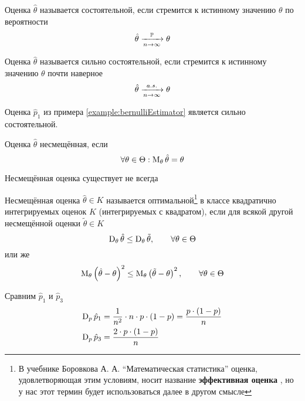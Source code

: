 \begin{definition}
    Оценка $\hat{\theta}$ называется состоятельной,
    если стремится к истинному значению $\theta$ по вероятности
    $$\hat{\theta}\xrightarrow[n\to\infty]{\mathbb{P}}\theta$$
\end{definition}
\begin{definition}
    Оценка $\hat{\theta}$ называется сильно состоятельной,
    если стремится к истинному значению $\theta$ почти наверное
    $$\hat{\theta}\xrightarrow[n\to\infty]{a.s.}\theta$$
\end{definition}
\begin{example}
    Оценка $\hat{p}_1$ из примера \ref{example:bernulliEstimator}
    является сильно состоятельной.
\end{example}
\begin{definition}
    Оценка $\hat{\theta}$ несмещённая, если
    $$\forall\theta\in\Theta: \operatorname{M}_{\theta} \hat{\theta}=\theta$$
\end{definition}
\begin{remark}Несмещённая оценка существует не всегда
\end{remark}
\begin{definition}Несмещённая оценка $\hat{\theta}\in K$
называется оптимальной\footnote{В учебнике Боровкова А. А.
``Математическая статистика'' оценка, удовлетворяющая этим условиям,
носит название \textbf{эффективная оценка} \cite[стр.~130]{BorovkovMS},
но у нас этот термин будет использоваться далее в другом смысле}
в классе квадратично интегрируемых оценок $K$ (интегрируемых с квадратом),
если для всякой другой несмещённой оценки $\tilde{\theta}\in K$
$$\operatorname{D}_{\theta} \hat{\theta}\le\operatorname{D}_{\theta} \tilde{\theta},
\qquad \forall\theta\in\Theta$$
или же
$$\operatorname{M}_{\theta} \left(\hat{\theta}-\theta\right)^2
\le\operatorname{M}_{\theta} \left(\tilde{\theta}-\theta\right)^2,
\qquad \forall\theta\in\Theta$$
\end{definition}

\begin{example}Сравним $\hat{p}_1$ и $\hat{p}_3$
    \begin{align*}
    \operatorname{D}_{p} \hat{p}_1
        &=\frac{1}{n^2}\cdot n\cdot p\cdot\left(1-p\right)
        =\frac{p\cdot\left(1-p\right)}{n}\\
    \operatorname{D}_{p} \hat{p}_3
        &=\frac{2\cdot p\cdot\left(1-p\right)}{n}
    \end{align*}
\end{example}

